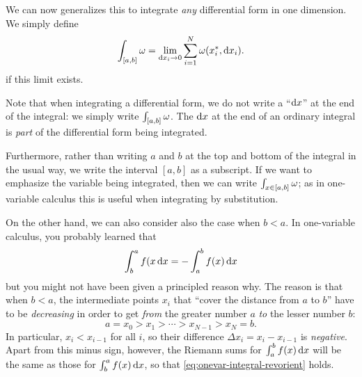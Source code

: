 We can now generalizes this to integrate \emph{any} differential form in one dimension.
We simply define
\[ \lint{[a,b]} \omega = \lim_{\dx_i \to 0} \sum_{i=1}^N \omega(\rstag x i,\dx_i). \]
if this limit exists.

Note that when integrating a differential form, we do not write a ``$\dx$'' at the end of the integral: we simply write $\lint{[a,b]} \omega$.
The $\dx$ at the end of an ordinary integral is \emph{part} of the differential form being integrated.

Furthermore, rather than writing $a$ and $b$ at the top and bottom of the integral in the usual way, we write the interval $[a,b]$ as a subscript.
If we want to emphasize the variable being integrated, then we can write $\lint{x\in [a,b]} \omega$; as in one-variable calculus this is useful when integrating by substitution.

\begin{eg}\label{eg:onevar-linint}
  

  On the other hand, we can also consider also the case when $b<a$.
  In one-variable calculus, you probably learned that
  \begin{equation}\label{eq:onevar-integral-revorient}
    \itint x b a {f(x} = - \itint x a b {f(x)}
  \end{equation}
  but you might not have been given a principled reason why.
  The reason is that when $b<a$, the intermediate points $x_i$ that ``cover the distance from $a$ to $b$'' have to be \emph{decreasing} in order to get \emph{from} the greater number $a$ \emph{to} the lesser number $b$:
  \[ a = x_0 > x_1 > \cdots > x_{N-1} > x_N = b.\]
  In particular, $x_i < x_{i-1}$ for all $i$, so their difference $\Delta x_i = x_i - x_{i-1}$ is \emph{negative}.
  Apart from this minus sign, however, the Riemann sums for $\itint x a b {f(x)}$ will be the same as those for $\itint x b a {f(x)}$, so that \cref{eq:onevar-integral-revorient} holds.
\end{eg}

